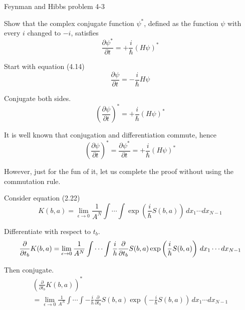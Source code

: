 \documentclass[12pt]{article}
\begin{document}
\begin{center}
Feynman and Hibbs problem 4-3
\end{center}

Show that the complex conjugate function $\psi^*$,
defined as the function $\psi$ with every $i$ changed to $-i$,
satisfies
\begin{equation*}
\frac{\partial\psi^*}{\partial t}=+\frac{i}{\hbar}(H\psi)^*
\end{equation*}

Start with equation (4.14)
\begin{equation*}
\frac{\partial\psi}{\partial t}=-\frac{i}{\hbar}H\psi
\end{equation*}

Conjugate both sides.
\begin{equation*}
\left(\frac{\partial\psi}{\partial t}\right)^*=+\frac{i}{\hbar}(H\psi)^*
\end{equation*}

It is well known that conjugation and differentiation commute, hence
\begin{equation*}
\left(\frac{\partial\psi}{\partial t}\right)^*=\frac{\partial\psi^*}{\partial t}=+\frac{i}{\hbar}(H\psi)^*
\end{equation*}

However, just for the fun of it, let us complete the proof without using the commutation rule.

\bigskip
Consider equation (2.22)
\begin{equation*}
K(b,a)=\lim_{\epsilon\rightarrow0}\frac{1}{A^N}\int\cdots\int
\exp\left(\frac{i}{\hbar}S(b,a)\right)\,dx_1\cdots dx_{N-1}
\end{equation*}

Differentiate with respect to $t_b$.
\begin{equation*}
\frac{\partial}{\partial t_b}K(b,a)
\\
=
\lim_{\epsilon\rightarrow0}\frac{1}{A^N}
\int\cdots\int
\frac{i}{h}\frac{\partial}{\partial t_b}S(b,a)
\exp\left(\frac{i}{\hbar}S(b,a)\right)\,dx_1\cdots dx_{N-1}
\end{equation*}

Then conjugate.
\begin{multline*}
\left(\frac{\partial}{\partial t_b}K(b,a)\right)^*
\\
=\lim_{\epsilon\rightarrow0}\frac{1}{A^N}
\int\cdots\int
-\frac{i}{h}\frac{\partial}{\partial t_b}S(b,a)
\exp\left(-\frac{i}{\hbar}S(b,a)\right)\,dx_1\cdots dx_{N-1}
\end{multline*}
\end{document}
